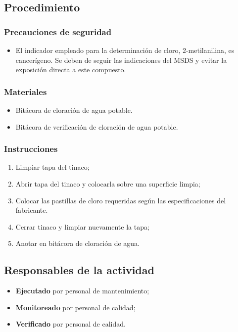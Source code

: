 \subsection{Procedimiento}

\subsubsection{Precauciones de seguridad}

\begin{itemize}
	\item El indicador empleado para la determinación de cloro, 2-metilanilina, es cancerígeno. Se deben de seguir las indicaciones del MSDS y evitar la exposición directa a este compuesto.
\end{itemize}

\subsubsection{Materiales}

\begin{itemize}
	\item Bitácora de cloración de agua potable.
	\item Bitácora de verificación de cloración de agua potable.
\end{itemize}

\subsubsection{Instrucciones}

\begin{enumerate}
	\item Limpiar tapa del tinaco;
	\item Abrir tapa del tinaco y colocarla sobre una superficie limpia;
	\item Colocar las pastillas de cloro requeridas según las especificaciones del fabricante.
	\item Cerrar tinaco y limpiar nuevamente la tapa;
	\item Anotar en bitácora de cloración de agua.
\end{enumerate}

\subsection{Responsables de la actividad}

\begin{itemize}
	\item \textbf{Ejecutado} por personal de mantenimiento;
	\item \textbf{Monitoreado} por personal de calidad;
	\item \textbf{Verificado} por personal de calidad.
\end{itemize}

